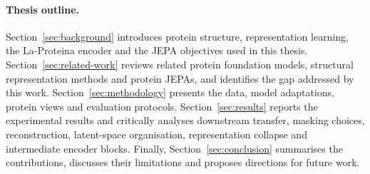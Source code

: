 \paragraph{Thesis outline.}
Section~\ref{sec:background} introduces protein structure, representation learning, the La-Proteina encoder and the JEPA objectives used in this thesis. Section~\ref{sec:related-work} reviews related protein foundation models, structural representation methods and protein JEPAs, and identifies the gap addressed by this work. Section~\ref{sec:methodology} presents the data, model adaptations, protein views and evaluation protocols. Section~\ref{sec:results} reports the experimental results and critically analyses downstream transfer, masking choices, reconstruction, latent-space organisation, representation collapse and intermediate encoder blocks. Finally, Section~\ref{sec:conclusion} summarises the contributions, discusses their limitations and proposes directions for future work.
